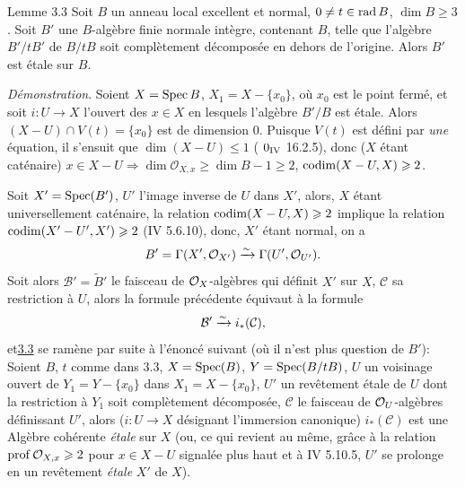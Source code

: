 \documentclass[10pt]{../fichiers-configuration-latex/smfart}
\begin{document}
\begin{enonce*}{Lemme 3.3}
Soit $B$ un anneau local excellent et normal, $0\neq t\in \operatorname{rad} B$,
$\dim B\geq 3$. Soit $B'$ une $B$-algèbre finie normale intègre,
contenant $B$, telle que l'algèbre $B'/tB'$ de $B/tB$ soit
complètement décomposée en dehors de l'origine. Alors $B'$ est étale
sur $B$.
\end{enonce*}

\noindent
\emph{Démonstration}. Soient $X=\operatorname{Spec} B$, $X_1=X-\{x_{0}\}$, où
$x_{0}$ est le point fermé, et soit $i:U\rightarrow X$ l'ouvert
des $x\in X$ en lesquels l'algèbre $B'/B$ est étale. Alors $(X-U)\cap
V(t)=\{x_{0}\}$ est de dimension $0$. Puisque $V(t)$ est défini
par \emph{une} équation, il s'ensuit que $\dim(X-U)\leq 1$ (\EGA
$0_{\text{\rm IV}}$ 16.2.5), donc ($X$ étant caténaire) $x\in
X-U\Rightarrow \dim \mathcal{O}_{X,x}\geq \dim B-1\geq 2$, \ie
$\operatorname{codim}(X-U,X)\geqslant 2$.

Soit $X'=\operatorname{Spec}(B')$, $U'$ l'image inverse de $U$ dans $X'$, alors, $X$
étant universellement caténaire, la relation $\operatorname{codim}(X-U,X)\geqslant 2$
implique la relation $\operatorname{codim}(X'-U',X')\geqslant 2$ (\EGA IV 5.6.10), donc,
$X'$ étant normal, on a
$$
B'=\Gamma(X',{\mathcal O}_{X'})\xrightarrow{\sim}
\Gamma(U',{\mathcal O}_{U'}){}.
$$
Soit alors $\mathcal{B}'=\widetilde{B}'$ le faisceau de ${\mathcal O}_X$-algèbres qui
définit $X'$ sur $X$, $\mathcal{C}$ sa restriction à $U$, alors la formule
précédente équivaut à la formule
$$
\mathcal{B}'\xrightarrow{\sim}i_{\ast}(\mathcal{C}){},
$$
et\pageoriginale \hyperref[XV.lem3.3]{3.3} se ramène par suite à l'énoncé suivant (où il
n'est plus question de $B'$): Soient $B$, $t$ comme dans 3.3,
$X=\operatorname{Spec}(B)$, $Y=\operatorname{Spec}(B/tB)$, $U$ un voisinage ouvert de
$Y_1=Y-\{x_{0}\}$ dans $X_1=X-\{x_{0}\}$, $U'$ un revêtement
étale de $U$ dont la restriction à $Y_1$ soit complètement décomposée,
$\mathcal{C}$ le faisceau de ${\mathcal O}_{U}$-algèbres définissant $U'$, alors
($i:U\rightarrow X$ désignant l'immersion canonique) $i_{\ast}(\mathcal{C})$
est une Algèbre cohérente \emph{étale} sur $X$ (ou, ce qui revient au
même, grâce à la relation $\operatorname{prof} {\mathcal O}_{X,x}\geqslant 2$ pour $x\in X-U$
signalée plus haut et à \EGA IV 5.10.5, $U'$ se prolonge en un
revêtement \emph{étale} $X'$ de $X$).
\end{document}
